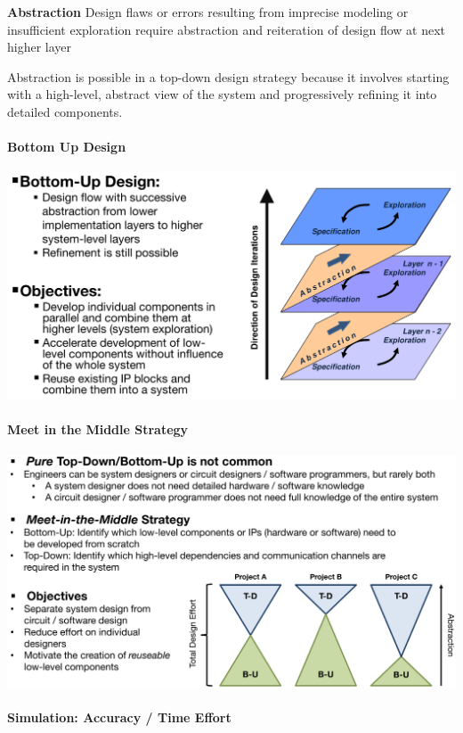 \documentclass[english]{latex4ei/latex4ei_sheet}
\begin{document}
\textbf{Abstraction} Design flaws or errors resulting from imprecise modeling or insufficient exploration require abstraction and reiteration of design flow at next higher layer

Abstraction is possible in a top-down design strategy because it involves starting with a high-level, abstract view of the system and progressively refining it into detailed components.
 
\paragraph{Bottom Up Design}

\begin{center}
  \includegraphics[width=0.8\linewidth]{assets/BottomUpDesign.png}
\end{center}
 
\paragraph{Meet in the Middle Strategy}

\begin{center}
  \includegraphics[width=0.8\linewidth]{assets/MeetInTheMiddle.png}
\end{center}

\paragraph{Simulation: Accuracy / Time Effort}
\end{document}
